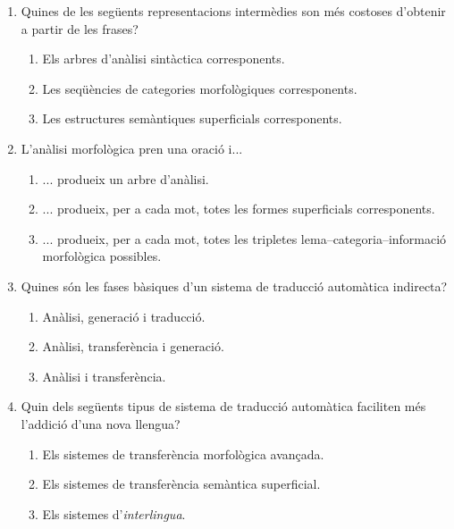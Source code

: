 \begin{enumerate}
\item Quines de les següents representacions intermèdies son més
  costoses d'obtenir a partir de les frases?
  \begin{enumerate}
  \item Els arbres d'anàlisi sintàctica corresponents.
  \item Les seqüències de categories morfològiques corresponents.
  \item Les estructures semàntiques superficials corresponents.
  \end{enumerate}

      
\item L'anàlisi morfològica pren una oració i...
  \begin{enumerate}
  \item ... produeix un arbre d'anàlisi.
  \item ... produeix, per a cada mot, totes les formes superficials
    corresponents.
  \item ... produeix, per a cada mot, totes les tripletes
    lema--categoria--informació morfològica possibles.
  \end{enumerate}

\item Quines són les fases bàsiques d'un sistema de traducció
  automàtica indirecta?
  \begin{enumerate}
  \item Anàlisi, generació i traducció.
  \item Anàlisi, transferència i generació.
  \item Anàlisi i transferència.
  \end{enumerate}

\item Quin dels següents tipus de sistema de traducció automàtica
  faciliten més l'addició d'una nova llengua?
  \begin{enumerate}
  \item Els sistemes de transferència morfològica avançada.
  \item Els sistemes de transferència semàntica superficial.
  \item Els sistemes d'\emph{interlingua}.
  \end{enumerate}


\end{enumerate}
